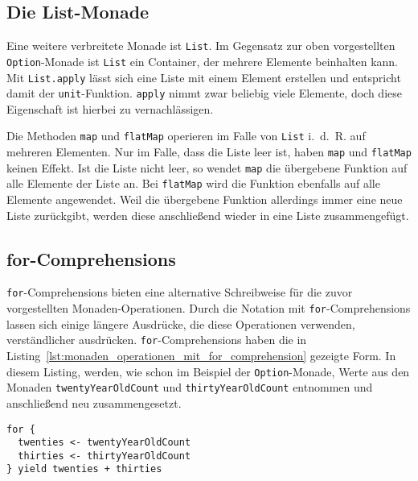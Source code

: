 
\subsection{Die List-Monade} %
\label{sub:die_list_monade}

Eine weitere verbreitete Monade ist \lstinline|List|.
Im Gegensatz zur oben vorgestellten \lstinline|Option|-Monade ist \lstinline|List| ein Container, der mehrere Elemente beinhalten kann.
Mit \lstinline|List.apply| lässt sich eine Liste mit einem Element erstellen und entspricht damit der \lstinline|unit|-Funktion.
\lstinline|apply| nimmt zwar beliebig viele Elemente, doch diese Eigenschaft ist hierbei zu vernachlässigen.

Die Methoden \lstinline|map| und \lstinline|flatMap| operieren im Falle von \lstinline|List| i.~d.~R. auf mehreren Elementen.
Nur im Falle, dass die Liste leer ist, haben \lstinline|map| und \lstinline|flatMap| keinen Effekt.
Ist die Liste nicht leer, so wendet \lstinline|map| die übergebene Funktion auf alle Elemente der Liste an.
Bei \lstinline|flatMap| wird die Funktion ebenfalls auf alle Elemente angewendet.
Weil die übergebene Funktion allerdings immer eine neue Liste zurückgibt, werden diese anschließend wieder in eine Liste zusammengefügt.



\subsection{for-Comprehensions} %
\label{sub:for_comprehensions}

\lstinline|for|-Comprehensions bieten eine alternative Schreibweise für die zuvor vorgestellten Monaden-Operationen.
Durch die Notation mit \lstinline|for|-Comprehensions lassen sich einige längere Ausdrücke, die diese Operationen verwenden, verständlicher ausdrücken.
\lstinline|for|-Comprehensions haben die in Listing~\ref{lst:monaden_operationen_mit_for_comprehension} gezeigte Form.
In diesem Listing, werden, wie schon im Beispiel der \lstinline|Option|-Monade, Werte aus den Monaden \lstinline|twentyYearOldCount| und \lstinline|thirtyYearOldCount| entnommen und anschließend neu zusammengesetzt.

\begin{lstlisting}[caption=Monaden-Operationen mit for-Comprehension, label=lst:monaden_operationen_mit_for_comprehension]
for {
  twenties <- twentyYearOldCount
  thirties <- thirtyYearOldCount
} yield twenties + thirties
\end{lstlisting}

